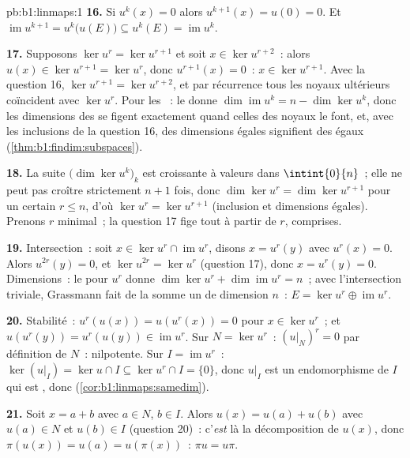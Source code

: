 \begin{solution}{pb:b1:linmaps:1}
\textbf{16.} Si $u^k(x) = 0$ alors $u^{k+1}(x) = u(0) = 0$. Et
$\operatorname{im} u^{k+1} = u^k\bigl(u(E)\bigr) \subseteq
u^k(E) = \operatorname{im} u^k$.

\textbf{17.} Supposons $\ker u^{r} = \ker u^{r+1}$ et soit $x \in
\ker u^{r+2}$~: alors $u(x) \in \ker u^{r+1} = \ker u^{r}$, donc
$u^{r+1}(x) = 0$~: $x \in \ker u^{r+1}$. Avec la question 16,
$\ker u^{r+1} = \ker u^{r+2}$, et par récurrence tous les noyaux
ultérieurs coïncident avec $\ker u^{r}$. Pour les ~: le 
donne $\dim\operatorname{im} u^k = n - \dim\ker u^k$, donc les
dimensions des  se figent exactement quand celles des noyaux le font,
et, avec les inclusions de la question 16, des dimensions égales signifient
des  égaux (\cref{thm:b1:findim:subspaces}).

\textbf{18.} La suite $\bigl(\dim\ker u^k\bigr)_k$ est
croissante à valeurs dans $\intint{0}{n}$~; elle ne peut pas croître
strictement $n + 1$ fois, donc $\dim\ker u^{r} = \dim\ker
u^{r+1}$ pour un certain $r \leq n$, d'où $\ker u^{r} = \ker u^{r+1}$
(inclusion et dimensions égales). Prenons $r$ minimal~; la question 17
fige tout à partir de $r$,  comprises.

\textbf{19.} Intersection~: soit $x \in \ker u^{r} \cap
\operatorname{im} u^{r}$, disons $x = u^{r}(y)$ avec $u^{r}(x) =
0$. Alors $u^{2r}(y) = 0$, et $\ker u^{2r} = \ker u^{r}$
(question 17), donc $x = u^{r}(y) = 0$. Dimensions~: le 
pour $u^{r}$ donne $\dim\ker u^{r} + \dim\operatorname{im} u^{r}
= n$~; avec l'intersection triviale, Grassmann fait de la somme un
 de dimension $n$~: $E = \ker u^{r} \oplus
\operatorname{im} u^{r}$.

\textbf{20.} Stabilité~: $u^{r}(u(x)) = u(u^{r}(x)) = 0$ pour $x
\in \ker u^{r}$~; et $u(u^{r}(y)) = u^{r}(u(y)) \in
\operatorname{im} u^{r}$. Sur $N = \ker u^{r}$~: $(u|_N)^{r} = 0$
par définition de $N$~: nilpotente. Sur $I = \operatorname{im}
u^{r}$~: $\ker(u|_I) = \ker u \cap I \subseteq \ker u^{r} \cap I
= \{0\}$, donc $u|_I$ est un endomorphisme  de $I$ qui est , donc 
(\cref{cor:b1:linmaps:samedim}).

\textbf{21.} Soit $x = a + b$ avec $a \in N$, $b \in I$. Alors
$u(x) = u(a) + u(b)$ avec $u(a) \in N$ et $u(b) \in I$
(question 20)~: c'\emph{est} là la décomposition de $u(x)$, donc
$\pi(u(x)) = u(a) = u(\pi(x))$~: $\pi u = u\pi$.


\end{solution}
